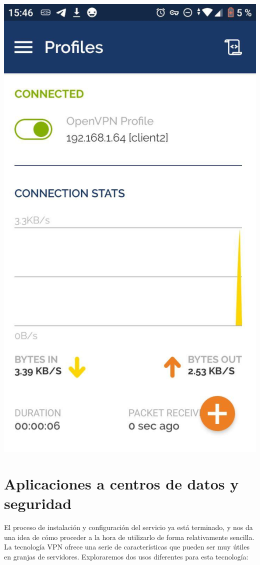 \documentclass[11pt,a4paper]{article}
\begin{document}
\begin{center}
\includegraphics[scale=0.4]{connected.jpg}
\end{center}

\newpage

\section{Aplicaciones a centros de datos y seguridad}

El proceso de instalación y configuración del servicio ya está terminado, y nos da una idea de cómo proceder a la hora de utilizarlo de forma relativamente sencilla. La tecnología VPN ofrece una serie de características que pueden ser muy útiles en granjas de servidores. Exploraremos dos usos diferentes para esta tecnología:
\end{document}
